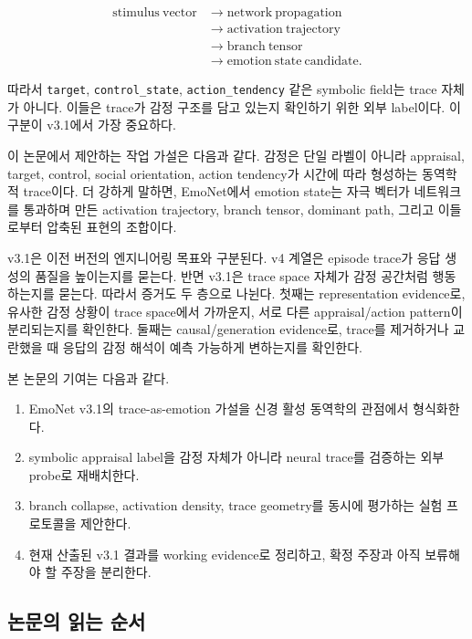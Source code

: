 \documentclass[11pt,a4paper]{article}
\begin{document}
\[
\begin{aligned}
\mathrm{stimulus\ vector}
&\rightarrow \mathrm{network\ propagation} \\
&\rightarrow \mathrm{activation\ trajectory} \\
&\rightarrow \mathrm{branch\ tensor} \\
&\rightarrow \mathrm{emotion\ state\ candidate}.
\end{aligned}
\]

따라서 \texttt{target}, \texttt{control\_state}, \texttt{action\_tendency} 같은 symbolic field는 trace 자체가 아니다. 이들은 trace가 감정 구조를 담고 있는지 확인하기 위한 외부 label이다. 이 구분이 v3.1에서 가장 중요하다.

이 논문에서 제안하는 작업 가설은 다음과 같다. 감정은 단일 라벨이 아니라 appraisal, target, control, social orientation, action tendency가 시간에 따라 형성하는 동역학적 trace이다. 더 강하게 말하면, EmoNet에서 emotion state는 자극 벡터가 네트워크를 통과하며 만든 activation trajectory, branch tensor, dominant path, 그리고 이들로부터 압축된 표현의 조합이다.

v3.1은 이전 버전의 엔지니어링 목표와 구분된다. v4 계열은 episode trace가 응답 생성의 품질을 높이는지를 묻는다. 반면 v3.1은 trace space 자체가 감정 공간처럼 행동하는지를 묻는다. 따라서 증거도 두 층으로 나뉜다. 첫째는 representation evidence로, 유사한 감정 상황이 trace space에서 가까운지, 서로 다른 appraisal/action pattern이 분리되는지를 확인한다. 둘째는 causal/generation evidence로, trace를 제거하거나 교란했을 때 응답의 감정 해석이 예측 가능하게 변하는지를 확인한다.

본 논문의 기여는 다음과 같다.

\begin{enumerate}
  \item EmoNet v3.1의 trace-as-emotion 가설을 신경 활성 동역학의 관점에서 형식화한다.
  \item symbolic appraisal label을 감정 자체가 아니라 neural trace를 검증하는 외부 probe로 재배치한다.
  \item branch collapse, activation density, trace geometry를 동시에 평가하는 실험 프로토콜을 제안한다.
  \item 현재 산출된 v3.1 결과를 working evidence로 정리하고, 확정 주장과 아직 보류해야 할 주장을 분리한다.
\end{enumerate}

\subsection{논문의 읽는 순서}
\end{document}
